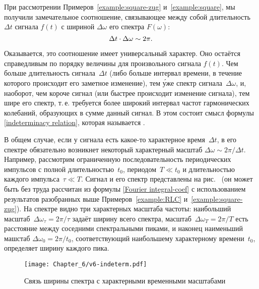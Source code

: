 При рассмотрении Примеров~\ref{example:square-zug} и~\ref{example:square},
мы получили замечательное соотношение, связывающее между собой
длительность~$\Delta t$ сигнала $f(t)$ с шириной $\Delta \omega$ его спектра
$F(\omega)$:
\begin{equation}
    \eqmark{indeterminacy relation}
    \Delta t \cdot \Delta\omega \sim 2\pi.
\end{equation}

Оказывается, это соотношение имеет универсальный характер.
Оно остаётся справедливым по порядку величины для произвольного сигнала $f(t)$.
Чем больше длительность сигнала~$\Delta t$ (либо больше интервал времени,
в течение которого происходит его заметное изменение), тем \'{у}же спектр
сигнала~$\Delta\omega$, и, наоборот, чем короче сигнал (или быстрее происходит
изменение сигнала), тем шире его спектр, т.\,е. требуется более широкий интервал
частот гармонических колебаний, образующих в сумме данный сигнал.
В этом состоит смысл формулы \eqref{indeterminacy relation},
которая называется .

В общем случае, если у сигнала есть какое-то характерное время~$\Delta t$,
в его спектре обязательно возникнет некоторый характерный масштаб
$\Delta \omega \sim 2\pi /\Delta t$. Например, рассмотрим ограниченную
последовательность периодических импульсов с полной длительностью~$t_0$,
периодом~$T\ll t_0$ и длительностью каждого импульса~$\tau\ll T$.
Сигнал и его спектр представлены на рис.~
(он может быть без труда рассчитан из формулы \eqref{Fourier integral-coef}
с использованием результатов разобранных выше Примеров~\ref{example:RLC}
и~\ref{example:square-zug}). На спектре видно три характерных масштаба частоты:
наибольший масштаб~$\Delta \omega_{\tau} = 2\pi/\tau$ задаёт ширину всего спектра,
масштаб~$\Delta \omega_T = 2\pi / T$ есть расстояние между соседними
спектральными пиками, и наконец наименьший машстаб $\Delta \omega_0 = 2\pi /t_0$,
соответствующий наибольшему характерному времени~$t_0$,
определяет ширину каждого пика.

\begin{figure}[h!]
\centering\texttt{[image: Chapter\_6/v6-indeterm.pdf]}
\caption{Связь ширины спектра с характерными временными масштабами}
\end{figure}


